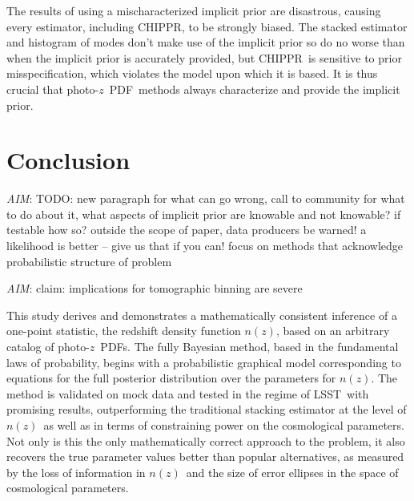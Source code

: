 \documentclass[iop]{emulateapj}
\newcommand{\todo}[3]{{\color{#2}\emph{#1}: #3}}
\newcommand{\aim}[1]{\todo{AIM}{red}{#1}}
\newcommand{\Tab}[1]{Table~\ref{#1}}
\newcommand{\project}[1]{{\textsc{#1}}}
\newcommand{\lsst}{\project{LSST}}
\newcommand{\Chippr}{\project{CHIPPR}}
\newcommand{\repo}[1]{{\texttt{#1}}~}
\newcommand{\chippr}{\repo{chippr}}
\newcommand{\nz}{$n(z)$}
\newcommand{\pz}{photo-$z$~}
\newcommand{\pzpdf}{\pz PDF}
\newcommand{\Nz}{$N(z)$~}
\begin{document}
The results of using a mischaracterized implicit prior are disastrous, causing every estimator, including \Chippr, to be strongly biased.
The stacked estimator and histogram of modes don't make use of the implicit prior so do no worse than when the implicit prior is accurately provided, but \Chippr\ is sensitive to prior misspecification, which violates the model upon which it is based.
It is thus crucial that \pzpdf\ methods always characterize and provide the implicit prior.


\section{Conclusion}
\label{sec:con}

\aim{TODO: new paragraph for what can go wrong, call to community for what to do about it, what aspects of implicit prior are knowable and not knowable?
	 if testable how so? outside the scope of paper, data producers be warned!
	 a likelihood is better -- give us that if you can!
	focus on methods that acknowledge probabilistic structure of problem}

\aim{claim: implications for tomographic binning are severe}

This study derives and demonstrates a mathematically consistent inference of a one-point statistic, the redshift density function \nz, based on an arbitrary catalog of \pzpdf s.  
The fully Bayesian method, based in the fundamental laws of probability, begins with a probabilistic graphical model corresponding to equations for the full posterior distribution over the parameters for \nz.  
The method is validated on mock data and tested in the regime of \lsst\ with promising results, outperforming the traditional stacking estimator at the level of \nz\ as well as in terms of constraining power on the cosmological parameters.
Not only is this the only mathematically correct approach to the problem, it also recovers the true parameter values better than popular alternatives, as measured by the loss of information in \nz\ and the size of error ellipses in the space of cosmological parameters.

\end{document}
